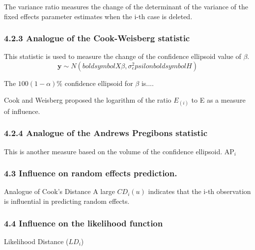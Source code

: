 \documentclass[12pt, a4paper]{article}
\begin{document}
The variance ratio measures the change of the determinant of the variance of the fixed effects parameter estimates when the i-th case is deleted.

\subsubsection*{4.2.3 Analogue of the Cook-Weisberg statistic}

This statistic is used to measure the change of the confidence ellipsoid value of $\beta$.
\[ \boldsymbol{y} \sim N ( boldsymbol{X}\beta , \sigma^2_epsilon boldsymbol{H})\]

The $100(1-\alpha)\%$ confidence ellipsoid for $\beta$ is....

Cook and Weisberg proposed the logarithm of the ratio $E_{(i)}$ to E as a measure of influence.




\subsubsection*{4.2.4 Analogue of the Andrews Pregibons statistic}
This is another measure based on the volume of the confidence ellipsoid. AP$_i$

\subsubsection*{4.3 Influence on random effects prediction.}
Analogue of Cook’s Distance
A large $CD_i(u)$ indicates that the i-th observation is influential in predicting random effects.

\subsubsection*{4.4 Influence on the likelihood function}
Likelihood Distance ($LD_i$)
\end{document}
